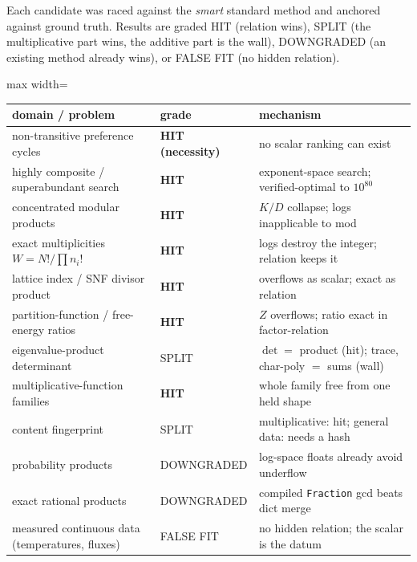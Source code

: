 \documentclass[11pt]{article}
\begin{document}
Each candidate was raced against the \emph{smart} standard method and anchored against ground truth. Results
are graded HIT (relation wins), SPLIT (the multiplicative part wins, the additive part is the wall),
DOWNGRADED (an existing method already wins), or FALSE FIT (no hidden relation).

\begin{center}
\begin{adjustbox}{max width=\linewidth}\begin{tabular}{lll}
\toprule
domain / problem & grade & mechanism \\
\midrule
non-transitive preference cycles & \textbf{HIT (necessity)} & no scalar ranking can exist \\
highly composite / superabundant search & \textbf{HIT} & exponent-space search; verified-optimal to $10^{80}$ \\
concentrated modular products & \textbf{HIT} & $K/D$ collapse; logs inapplicable to mod \\
exact multiplicities $W=N!/\prod n_i!$ & \textbf{HIT} & logs destroy the integer; relation keeps it \\
lattice index / SNF divisor product & \textbf{HIT} & overflows as scalar; exact as relation \\
partition-function / free-energy ratios & \textbf{HIT} & $Z$ overflows; ratio exact in factor-relation \\
eigenvalue-product determinant & SPLIT & $\det=$ product (hit); trace, char-poly $=$ sums (wall) \\
multiplicative-function families & \textbf{HIT} & whole family free from one held shape \\
content fingerprint & SPLIT & multiplicative: hit; general data: needs a hash \\
probability products & DOWNGRADED & log-space floats already avoid underflow \\
exact rational products & DOWNGRADED & compiled \texttt{Fraction} gcd beats dict merge \\
measured continuous data (temperatures, fluxes) & FALSE FIT & no hidden relation; the scalar is the datum \\
\bottomrule
\end{tabular}\end{adjustbox}
\end{center}
\end{document}
